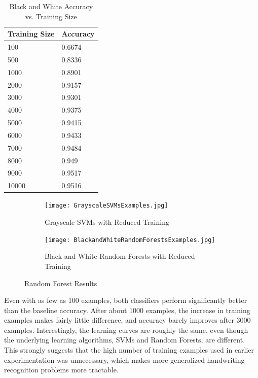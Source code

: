 \documentclass[12pt]{article}
\begin{document}
\begin{table}[H]
\centering
\caption{Black and White Accuracy vs. Training Size}
    \begin{tabular}{|l|l|}
    \hline
    Training Size & Accuracy \\ \hline
    100      & 0.6674   \\ \hline
    500      & 0.8336   \\ \hline
    1000      & 0.8901   \\ \hline
    2000      & 0.9157   \\ \hline
    3000      & 0.9301   \\ \hline
    4000      & 0.9375   \\ \hline
    5000      & 0.9415   \\ \hline
    6000      & 0.9433   \\ \hline
    7000      & 0.9484   \\ \hline
    8000      & 0.949   \\ \hline
    9000      & 0.9517   \\ \hline
    10000      & 0.9516   \\ \hline
    \end{tabular}
\end{table}

\begin{figure}[h]
\centering
\begin{subfigure}{.45\textwidth}
  \centering
  \texttt{[image: GrayscaleSVMsExamples.jpg]}
  \caption{Grayscale SVMs with Reduced Training}
  \label{fig:sub1}
\end{subfigure}%
\hspace{2mm}
\begin{subfigure}{.45\textwidth}
  \centering
  \texttt{[image: BlackandWhiteRandomForestsExamples.jpg]}
  \caption{Black and White Random Forests with Reduced Training}
  \label{fig:sub2}
\end{subfigure}
\caption{Random Forest Results}
\label{fig:test}
\end{figure}

Even with as few as 100 examples, both classifiers perform significantly better than the baseline accuracy. After about 1000 examples, the increase in training examples makes fairly little difference, and accuracy barely improves after 3000 examples. Interestingly, the learning curves are roughly the same, even though the underlying learning algorithms, SVMs and Random Forests, are different. This strongly suggests that the high number of training examples used in earlier experimentation was unnecessary, which makes more generalized handwriting recognition problems more tractable. 
\end{document}

